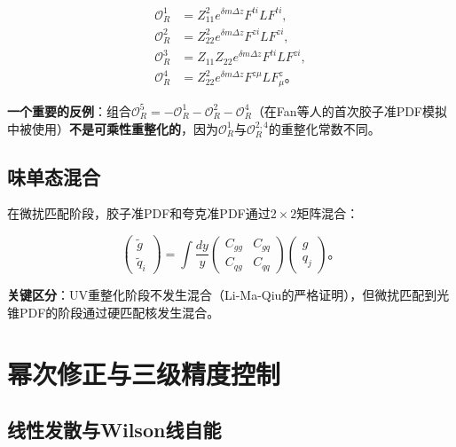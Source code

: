 \documentclass[12pt,a4paper]{ctexart}
\theoremstyle{definition}
\begin{document}
\begin{equation}
\begin{aligned}
\mathcal{O}^1_R &= Z^2_{11} e^{\delta m \Delta z} F^{ti} L F^{ti}, \\
\mathcal{O}^2_R &= Z^2_{22} e^{\delta m \Delta z} F^{zi} L F^{zi}, \\
\mathcal{O}^3_R &= Z_{11}Z_{22} e^{\delta m \Delta z} F^{ti} L F^{zi}, \\
\mathcal{O}^4_R &= Z^2_{22} e^{\delta m \Delta z} F^{z\mu} L F^z_\mu。
\end{aligned}
\end{equation}

\textbf{一个重要的反例}\cite{Zhang2019}：组合$\mathcal{O}^5_R = -\mathcal{O}^1_R - \mathcal{O}^2_R - \mathcal{O}^4_R$（在Fan等人的首次胶子准PDF模拟中被使用\cite{Fan2018gluon}）\textbf{不是可乘性重整化的}，因为$\mathcal{O}^1_R$与$\mathcal{O}^{2,4}_R$的重整化常数不同。

\subsection{味单态混合}

在微扰匹配阶段，胶子准PDF和夸克准PDF通过$2\times2$矩阵混合\cite{Zhang2019,Yao2023}：

\begin{equation}
\begin{pmatrix} \tilde{g} \\ \tilde{q}_i \end{pmatrix} = \int \frac{dy}{y}
\begin{pmatrix} C_{gg} & C_{gq} \\ C_{qg} & C_{qq} \end{pmatrix}
\begin{pmatrix} g \\ q_j \end{pmatrix}。
\end{equation}

\textbf{关键区分}\cite{Zhang2019}：UV重整化阶段不发生混合（Li-Ma-Qiu\cite{Li2018multiplicative}的严格证明），但微扰匹配到光锥PDF的阶段通过硬匹配核发生混合。

\section{幂次修正与三级精度控制}

\subsection{线性发散与Wilson线自能}
\end{document}
